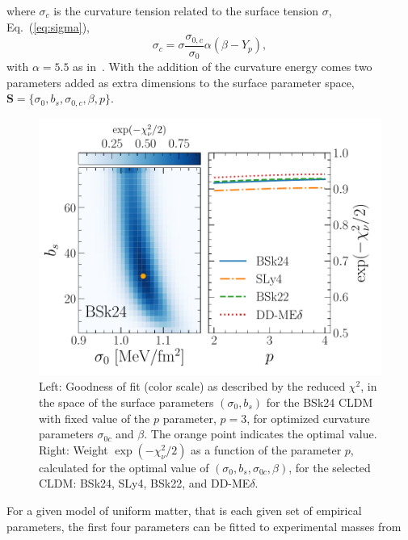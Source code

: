 %
where $\sigma_c$ is the curvature tension related to the surface tension
$\sigma$, Eq.~(\ref{eq:sigma}),
%
\begin{equation}
  \sigma_c =
  \sigma\frac{\sigma_{0,c}}{\sigma_0}\alpha(\beta-Y_p),\label{eq:sigmac}
\end{equation}
%
with $\alpha = 5.5$ as in~\cite{Newton2012}. With the addition of the
curvature energy comes two parameters added as extra dimensions to 
the surface parameter space, $\bm{S} = \{\sigma_0, b_s, \sigma_{0,c}, \beta,
p\}$.
%
\begin{figure}[!t]
\begin{center}
  \includegraphics[width=0.9\linewidth]{figures/surf_fit.pdf}
\end{center}
\caption[{Fit of surface and curvature parameters}]{{Left: Goodness 
    of fit (color scale) as described 
    by the reduced $\chi^2$, in the space of the surface parameters 
    $(\sigma_0,b_s)$ for the BSk24 CLDM with fixed value of the $p$ parameter, 
$p=3$, for optimized curvature parameters $\sigma_{0c}$ and $\beta$. The orange 
point indicates the optimal value. Right: Weight $\exp(-\chi^2_\nu/2)$ as a 
function of the parameter $p$, calculated for the optimal value of
$(\sigma_0,b_s,\sigma_{0c},\beta)$, for the selected 
CLDM: BSk24, SLy4, BSk22, and DD-ME$\delta$.}}\label{fig:surf_fit}
\end{figure}
%
For a given model of uniform matter, that is each given set of empirical
parameters, the first four parameters can be fitted to experimental masses from 
